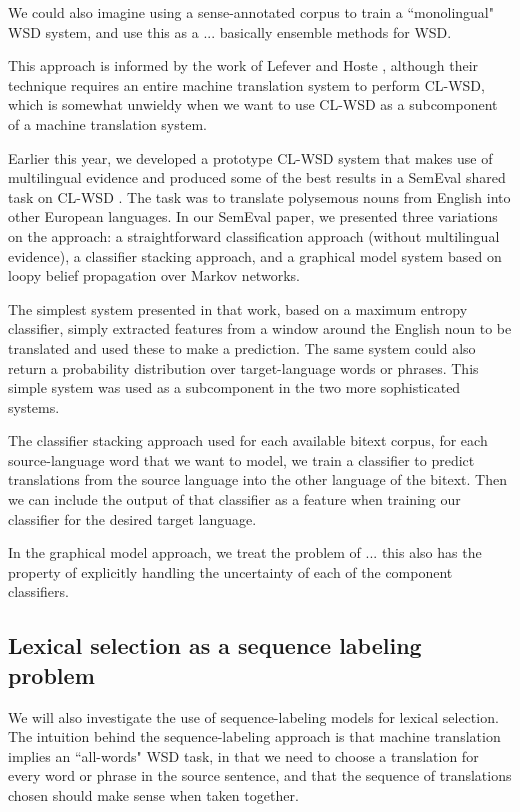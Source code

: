 We could also imagine using a sense-annotated corpus to train a ``monolingual"
WSD system, and use this as a 
... basically ensemble methods for WSD.

This approach is informed by the work of Lefever and Hoste
\cite{lefever-hoste-decock:2011:ACL-HLT2011}, although their technique requires
an entire machine translation system to perform CL-WSD, which is somewhat
unwieldy when we want to use CL-WSD as a subcomponent of a machine translation
system.

Earlier this year, we developed a prototype CL-WSD system that makes use of
multilingual evidence \cite{rudnick-liu-gasser:2013:SemEval-2013} and produced
some of the best results in a SemEval shared task on CL-WSD \cite{task10}.
The task was to translate polysemous nouns from English into other European
languages. In our SemEval paper, we presented three variations on the approach:
a straightforward classification approach (without multilingual evidence), a
classifier stacking approach, and a graphical model system based on loopy
belief propagation over Markov networks.

The simplest system presented in that work, based on a maximum entropy
classifier, simply extracted features from a window around the English noun to
be translated and used these to make a prediction. The same system could also
return a probability distribution over target-language words or phrases. This
simple system was used as a subcomponent in the two more sophisticated systems.

The classifier stacking approach used 
for each available bitext corpus, for each source-language word that we want to
model, we train a classifier to predict translations from the source language
into the other language of the bitext.
Then we can include the output of that classifier as a feature when training
our classifier for the desired target language.


In the graphical model approach, we treat the problem of 
... this also has the property of explicitly handling the uncertainty of each
of the component classifiers.

\subsection{Lexical selection as a sequence labeling problem}
We will also investigate the use of sequence-labeling models for lexical
selection.  The intuition behind the sequence-labeling approach is that machine
translation implies an ``all-words" WSD task, in that we need to choose a
translation for every word or phrase in the source sentence, and that the
sequence of translations chosen should make sense when taken together.

